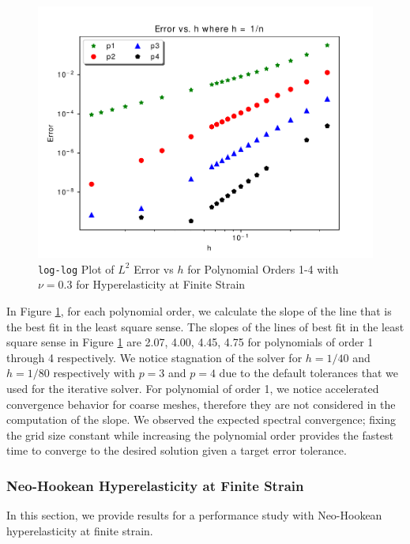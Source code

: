 \begin{figure}[hbt!]
 \begin{center}
      \includegraphics[width=1\textwidth]{../img/conv.pdf}
\end{center}
\caption{\texttt{log-log} Plot of $L^2$ Error vs $h$ for Polynomial Orders 1-4 with $\nu = 0.3$ for Hyperelasticity at Finite Strain}
    \label{fig:lin-elas-conv}
\end{figure}

In Figure \ref{fig:lin-elas-conv}, for each polynomial order, we calculate the slope of the line that is the best fit in the least square sense.
The slopes of the lines of best fit in the least square sense in Figure \ref{fig:lin-elas-conv} are 2.07, 4.00, 4.45, 4.75 for polynomials of order 1 through 4 respectively.
We notice stagnation of the solver for $h = 1/40$ and $h = 1/80$ respectively with $p = 3$ and $p = 4$ due to the default tolerances that we used for the iterative solver.
For polynomial of order 1, we notice accelerated convergence behavior for coarse meshes, therefore they are not considered in the computation of the slope.
We observed the expected spectral convergence; fixing the grid size constant while increasing the polynomial order provides the fastest time to converge to the desired solution given a target error tolerance.

\subsubsection{Neo-Hookean Hyperelasticity at Finite Strain}

In this section, we provide results for a performance study with Neo-Hookean hyperelasticity at finite strain.

